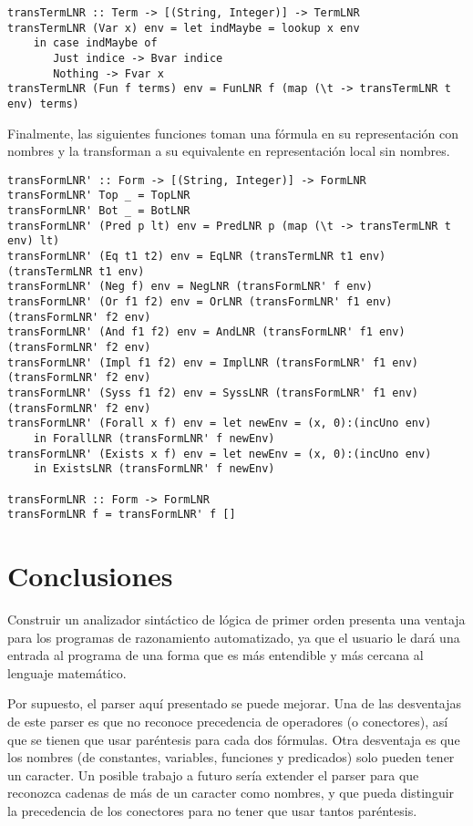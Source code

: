 \documentclass{article}
\begin{document}
{\small
\begin{verbatim}
transTermLNR :: Term -> [(String, Integer)] -> TermLNR
transTermLNR (Var x) env = let indMaybe = lookup x env
    in case indMaybe of
       Just indice -> Bvar indice
       Nothing -> Fvar x
transTermLNR (Fun f terms) env = FunLNR f (map (\t -> transTermLNR t env) terms)
\end{verbatim}
}

Finalmente, las siguientes funciones toman una fórmula en su representación con nombres y la transforman a su equivalente en representación local sin nombres.

{\small
\begin{verbatim}
transFormLNR' :: Form -> [(String, Integer)] -> FormLNR
transFormLNR' Top _ = TopLNR
transFormLNR' Bot _ = BotLNR
transFormLNR' (Pred p lt) env = PredLNR p (map (\t -> transTermLNR t env) lt)
transFormLNR' (Eq t1 t2) env = EqLNR (transTermLNR t1 env) (transTermLNR t1 env)
transFormLNR' (Neg f) env = NegLNR (transFormLNR' f env)
transFormLNR' (Or f1 f2) env = OrLNR (transFormLNR' f1 env) (transFormLNR' f2 env)
transFormLNR' (And f1 f2) env = AndLNR (transFormLNR' f1 env) (transFormLNR' f2 env)
transFormLNR' (Impl f1 f2) env = ImplLNR (transFormLNR' f1 env) (transFormLNR' f2 env)
transFormLNR' (Syss f1 f2) env = SyssLNR (transFormLNR' f1 env) (transFormLNR' f2 env)
transFormLNR' (Forall x f) env = let newEnv = (x, 0):(incUno env)
    in ForallLNR (transFormLNR' f newEnv)
transFormLNR' (Exists x f) env = let newEnv = (x, 0):(incUno env)
    in ExistsLNR (transFormLNR' f newEnv)

transFormLNR :: Form -> FormLNR
transFormLNR f = transFormLNR' f []
\end{verbatim}
}

\section{Conclusiones}

Construir un analizador sintáctico de lógica de primer orden presenta una ventaja para los programas de razonamiento automatizado, ya que el usuario le dará una entrada al programa de una forma que es más entendible y más cercana al lenguaje matemático.

Por supuesto, el parser aquí presentado se puede mejorar. Una de las desventajas de este parser es que no reconoce precedencia de operadores (o conectores), así que se tienen que usar paréntesis para cada dos fórmulas. Otra desventaja es que los nombres (de constantes, variables, funciones y predicados) solo pueden tener un caracter. Un posible trabajo a futuro sería extender el parser para que reconozca cadenas de más de un caracter como nombres, y que pueda distinguir la precedencia de los conectores para no tener que usar tantos paréntesis.
\end{document}
